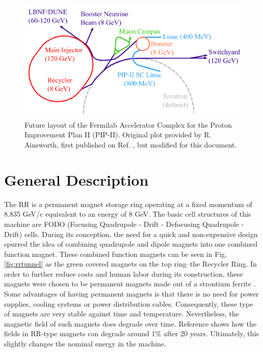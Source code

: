 \begin{figure}[H]
   \centering
   \includegraphics[width=\columnwidth]{chapter3/complexPIPII.png}
   \caption{Future layout of the Fermilab Accelerator Complex for the Proton Improvement Plan II (PIP-II). Original plot provided by R. Ainsworth, first published on Ref. \cite{rr1}, but modified for this document.}
   \label{fig:fnalpip2}
\end{figure}

\section{\label{sec:rrgen}General Description}

The RR is a permanent magnet storage ring operating at a fixed momentum of 8.835 GeV/c equivalent to an energy of 8 GeV. The basic cell structures of this machine are FODO (Focusing Quadrupole - Drift - Defocusing Quadrupole - Drift) cells. During its conception, the need for a quick and non-expensive design spurred the idea of combining quadrupole and dipole magnets into one combined function magnet. These combined function magnets can be seen in Fig. \ref{fig:rrtunnel} as the green covered magnets on the top ring--the Recycler Ring. In order to further reduce costs and human labor during its construction, these magnets were chosen to be permanent magnets made out of a strontium ferrite \cite{rr0}. Some advantages of having permanent magnets is that there is no need for power supplies, cooling systems or power distribution cables. Consequently, these type of magnets are very stable against time and temperature. Nevertheless, the magnetic field of such magnets does degrade over time. Reference \cite{rr1} shows how the fields in RR-type magnets can degrade around 1\% after 20 years. Ultimately, this slightly changes the nominal energy in the machine. 

